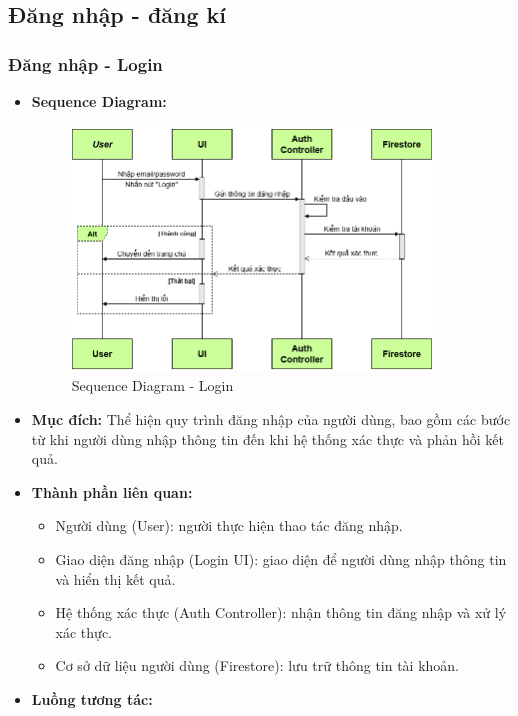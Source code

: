\documentclass[a4paper]{article}
\begin{document}
\subsection{Đăng nhập - đăng kí}
\subsubsection{Đăng nhập - Login}
\begin{itemize}
	\item \textbf{Sequence Diagram:}
	      \begin{figure}[H]
		      \centering
		      \includegraphics[width=0.9\textwidth]{Images/login_sequence.png}
		      \caption{Sequence Diagram - Login}
	      \end{figure}
	\item \textbf{Mục đích:} Thể hiện quy trình đăng nhập của người dùng, bao gồm các bước từ khi người dùng nhập thông tin đến khi hệ thống xác thực và phản hồi kết quả.
	\item \textbf{Thành phần liên quan:}
	      \begin{itemize}
		      \item Người dùng (User): người thực hiện thao tác đăng nhập.
		      \item Giao diện đăng nhập (Login UI): giao diện để người dùng nhập thông tin và hiển thị kết quả.
		      \item Hệ thống xác thực (Auth Controller): nhận thông tin đăng nhập và xử lý xác thực.
		      \item Cơ sở dữ liệu người dùng (Firestore): lưu trữ thông tin tài khoản.
	      \end{itemize}
	\item \textbf{Luồng tương tác:}
	      \begin{enumerate}

\end{enumerate}
\end{itemize}
\end{document}
